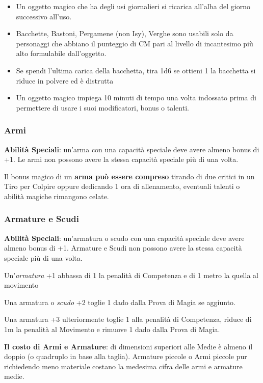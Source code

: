 \begin{multicols}{2}
\begin{itemize}[leftmargin=*]
\item
Un oggetto magico che ha degli usi giornalieri si ricarica all'alba del giorno successivo all'uso.
\item
Bacchette, Bastoni, Pergamene (non Isy), Verghe sono usabili solo da personaggi che abbiano il punteggio di CM pari al livello di incantesimo più alto formulabile dall'oggetto.
\item
Se spendi l'ultima carica della bacchetta, tira 1d6 se ottieni 1 la bacchetta si riduce in polvere ed è distrutta
\item
Un oggetto magico impiega 10 minuti di tempo una volta indossato prima di permettere di usare i suoi modificatori, bonus o talenti.

\end{itemize}

\subsubsection{Armi}

\textbf{Abilità Speciali}: un'arma con una capacità speciale deve avere almeno bonus di +1. Le armi non possono avere la stessa capacità speciale più di una volta.

Il bonus magico di un \textbf{arma può essere compreso} tirando di due critici in un Tiro per Colpire oppure dedicando 1 ora di allenamento, eventuali talenti o abilità magiche rimangono celate.

\subsubsection{Armature e Scudi}

\textbf{Abilità Speciali}: un'armatura o scudo con una capacità speciale deve avere almeno bonus di +1. Armature e Scudi non possono avere la stessa capacità speciale più di una volta.

Un'\emph{armatura} +1 abbassa di 1 la penalità di Competenza e di 1 metro la quella al movimento

Una armatura o \emph{scudo} +2 toglie 1 dado dalla Prova di Magia se aggiunto.

Una armatura +3 ulteriormente toglie 1 alla penalità di Competenza, riduce di 1m la penalità al Movimento e rimuove 1 dado dalla Prova di Magia.

\textbf{Il costo di Armi e Armature}: di dimensioni superiori alle Medie è almeno il doppio (o quadruplo in base alla taglia). Armature piccole o Armi piccole pur richiedendo meno materiale costano la medesima cifra delle armi e armature medie.


\end{multicols}
